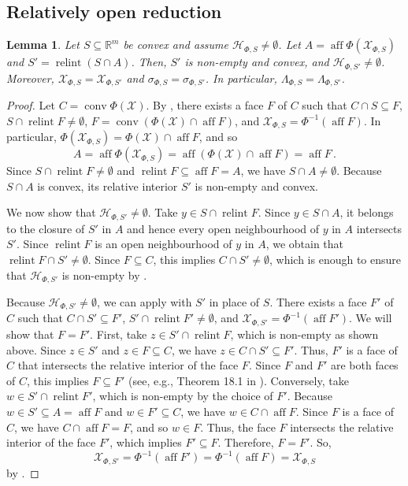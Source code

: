 \documentclass[10pt, a4paper]{article}
\newcommand{\Hh}{\mathcal H}
\newcommand{\HhP}{\Hh_{\Phi,S}}
\newcommand{\LP}{\Lambda_{\Phi,S}}
\newcommand{\R}{\mathbb R}
\newcommand{\sP}{\sigma_{\Phi,S}}
\newcommand{\X}{\mathcal X}
\newcommand{\XP}{\X_{\Phi,S}}
\DeclareMathOperator{\aff}{aff}
\DeclareMathOperator{\conv}{conv}
\DeclareMathOperator{\relint}{relint}
\newtheorem{lemma}{Lemma}
\begin{document}
\subsection{Relatively open reduction}
\begin{lemma}\label{lemma:ropen}
    Let $S\subseteq\R^m$ be convex and assume  $\HhP\neq\emptyset$. Let $A = \aff\Phi(\XP)$ and $S'=\relint(S\cap A)$. Then, $S'$ is non-empty and convex, and $\Hh_{\Phi,S'}\neq\emptyset$. Moreover, $\XP = \X_{\Phi,S'}$ and $\sP = \sigma_{\Phi,S'}$. In particular, $\LP = \Lambda_{\Phi,S'}$. 
\end{lemma}
\begin{proof}
    Let $C=\conv\Phi(\X)$. By , there exists a face $F$ of $C$ such that $C\cap S \subseteq F$, $S\cap\relint F\neq\emptyset$, $F = \conv(\Phi(\X)\cap\aff F)$, and $\XP=\Phi^{-1}(\aff F)$. In particular, $\Phi(\XP) = \Phi(\X)\cap\aff F$, and so
    $$A = \aff\Phi(\XP) = \aff(\Phi(\X)\cap\aff F) = \aff F\,.$$ Since $S\cap\relint F\neq\emptyset$ and $\relint F\subseteq\aff F = A$, we have $S\cap A\neq\emptyset$. Because $S\cap A$ is convex, its relative interior $S'$ is non-empty and convex. 

    We now show that $\Hh_{\Phi,S'}\neq\emptyset$. Take $y\in S\cap\relint F$. Since $y\in S\cap A$, it belongs to the closure of $S'$ in $A$ and hence every open neighbourhood of $y$ in $A$ intersects $S'$. Since $\relint F$ is an open neighbourhood of $y$ in $A$, we obtain that $\relint F\cap S'\neq\emptyset$. Since $F\subseteq C$, this implies $C\cap S'\neq\emptyset$, which is enough to ensure that $\Hh_{\Phi,S'}$ is non-empty by .

    Because $\Hh_{\Phi,S'}\neq\emptyset$, we can apply  with $S'$ in place of $S$. There exists a face $F'$ of $C$ such that $C\cap S'\subseteq F'$, $S'\cap\relint F'\neq\emptyset$, and $\X_{\Phi,S'} = \Phi^{-1}(\aff F')$.
    We will show that $F = F'$. First, take $z\in S'\cap\relint F$, which is non-empty as shown above. Since $z\in S'$ and $z\in F\subseteq C$, we have $z\in C\cap S'\subseteq F'$. Thus, $F'$ is a face of $C$ that intersects the relative interior of the face $F$. Since $F$ and $F'$ are both faces of $C$, this implies $F\subseteq F'$ (see, e.g., Theorem 18.1 in \citealt{rockafellar1970convex}).
    Conversely, take $w\in S'\cap\relint F'$, which is non-empty by the choice of $F'$. Because $w\in S'\subseteq A = \aff F$ and $w\in F'\subseteq C$, we have $w\in C\cap\aff F$. Since $F$ is a face of $C$, we have $C\cap\aff F = F$, and so $w\in F$. Thus, the face $F$ intersects the relative interior of the face $F'$, which implies $F'\subseteq F$. Therefore, $F = F'$. So,
    $$\X_{\Phi,S'} = \Phi^{-1}(\aff F') = \Phi^{-1}(\aff F) = \XP$$ by .


\end{proof}
\end{document}
